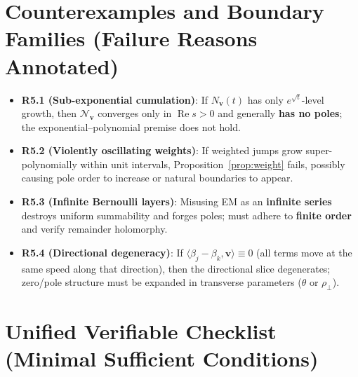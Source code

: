 \documentclass[11pt,a4paper]{article}
\theoremstyle{remark}
\DeclareMathOperator{\Re}{Re}
\begin{document}
\section{Counterexamples and Boundary Families (Failure Reasons Annotated)}

\begin{itemize}
\item \textbf{R5.1 (Sub-exponential cumulation)}: If $N_{\mathbf{v}}(t)$ has only $e^{\sqrt{t}}$-level growth, then $\mathscr{N}_{\mathbf{v}}$ converges only in $\Re s>0$ and generally \textbf{has no poles}; the exponential--polynomial premise does not hold.

\item \textbf{R5.2 (Violently oscillating weights)}: If weighted jumps grow super-polynomially within unit intervals, Proposition~\ref{prop:weight} fails, possibly causing pole order to increase or natural boundaries to appear.

\item \textbf{R5.3 (Infinite Bernoulli layers)}: Misusing EM as an \textbf{infinite series} destroys uniform summability and forges poles; must adhere to \textbf{finite order} and verify remainder holomorphy.

\item \textbf{R5.4 (Directional degeneracy)}: If $\langle\beta_j-\beta_k,\mathbf{v}\rangle\equiv0$ (all terms move at the same speed along that direction), then the directional slice degenerates; zero/pole structure must be expanded in transverse parameters ($\theta$ or $\rho_\perp$).
\end{itemize}

\section{Unified Verifiable Checklist (Minimal Sufficient Conditions)}
\end{document}
